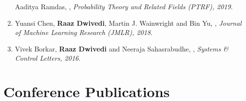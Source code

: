 \documentclass[margin,centered]{res}
\begin{document}
\begin{resume}
\begin{enumerate}[label={J\arabic*.},leftmargin=*]
Aaditya Ramdas, \href{https://link.springer.com/article/10.1007/s00440-018-0860-y}{}, \emph{Probability Theory and Related Fields (PTRF), 2019}.
\item Yuansi Chen\eqc, \textbf{Raaz Dwivedi}\eqc, Martin
J. Wainwright and Bin Yu, \href{https://jmlr.org/papers/volume19/18-158/18-158.pdf} {}, \textit{Journal of Machine Learning Research (JMLR), 2018}. 
\item Vivek Borkar\alpo, \textbf{Raaz Dwivedi} and Neeraja Sahasrabudhe,
\href{https://www.sciencedirect.com/science/article/abs/pii/S016769111600058X}{
},
\emph{Systems \& Control Letters, 2016}.
\end{enumerate}




\section{\sc Conference Publications}


\end{resume}
\end{document}
